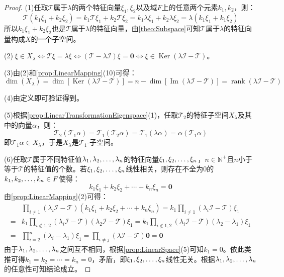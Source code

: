 \begin{proof}
	(1)任取$\mathcal{T}$属于$\lambda$的两个特征向量$\xi_1,\xi_2$以及域$F$上的任意两个元素$k_1,k_2$，则：
	\begin{equation*}
		\mathcal{T}(k_1\xi_1+k_2\xi_2)=k_1\mathcal{T}\xi_1+k_2\mathcal{T}\xi_2=k_1\lambda\xi_1+k_2\lambda\xi_2=\lambda(k_1\xi_1+k_1\xi_2)
	\end{equation*}
	所以$k_1\xi_1+k_2\xi_2$也是$\mathcal{T}$属于$\lambda$的特征向量，由\cref{theo:Subspace}可知$\mathcal{T}$属于$\lambda$的特征向量构成$X$的一个子空间。\par
	(2)$\;\xi\in X_{\lambda}\iff\mathcal{T}\xi=\lambda\xi\iff(\mathcal{T}-\lambda\mathcal{I})\xi=\mathbf{0}\iff\xi\in\operatorname{Ker}(\lambda\mathcal{I}-\mathcal{T})$。\par
	(3)由(2)和\cref{prop:LinearMapping}(10)可得：
	\begin{equation*}
		\dim(X_{\lambda})=\dim[\operatorname{Ker}(\lambda\mathcal{I}-\mathcal{T})]=n-\dim[\operatorname{Im}(\lambda\mathcal{I}-\mathcal{T})]=\operatorname{rank}(\lambda\mathcal{I}-\mathcal{T})
	\end{equation*}\par
	(4)由定义即可验证得到。\par
	(5)根据\cref{prop:LinearTransformationEigenspace}(1)，任取$\mathcal{T}_2$的特征子空间$X_\lambda$及其中的向量$\alpha$，则：
	\begin{equation*}
		\mathcal{T}_2(\mathcal{T}_1\alpha)=\mathcal{T}_1(\mathcal{T}_2\alpha)=\mathcal{T}_1(\lambda\alpha)=\alpha(\mathcal{T}_1\alpha)
	\end{equation*}
	即$\mathcal{T}_1\alpha\in X_\lambda$，于是$X_\lambda$是$\mathcal{T}_1$-子空间。\par
	(6)任取$\mathcal{T}$属于不同特征值$\lambda_1, \lambda_2, \dots, \lambda_{n}$的特征向量$\xi_1, \xi_2, \dots, \xi_{n}$，$n\in\mathbb{N}^+$且$n$小于等于$\mathcal{T}$的特征值的个数。若$\xi_1, \xi_2, \dots, \xi_{n}$线性相关，则存在不全为$0$的$k_1, k_2, \dots, k_{n}\in F$使得：
	\begin{equation*}
		k_1\xi_1+k_2\xi_2+\cdots+k_n\xi_n=\mathbf{0}
	\end{equation*}
	由\cref{prop:LinearMapping}(2)可得：
	\begin{align*}
		&\prod_{i\ne 1}(\lambda_i\mathcal{I}-\mathcal{T})\left(k_1\xi_1+k_2\xi_2+\cdots+k_n\xi_n\right)=k_1\prod_{i\ne 1}(\lambda_i\mathcal{I}-\mathcal{T})\xi_1 \\
		=&k_1\prod_{i\notin{1,2}}(\lambda_i\mathcal{I}-\mathcal{T})(\lambda_2\mathcal{I}-\mathcal{T})\xi_1=k_1\prod_{i\notin{1,2}}(\lambda_i\mathcal{I}-\mathcal{T})(\lambda_2-\lambda_1)\xi_1 \\
		=&\prod_{i=2}^{n}(\lambda_i-\lambda_1)\xi_1=\prod_{i\ne j}(\lambda\mathcal{I}-\mathcal{T})\mathbf{0}=\mathbf{0}
	\end{align*}
	由于$\lambda_1, \lambda_2, \dots, \lambda_{n}$之间互不相同，根据\cref{prop:LinearSpace}(5)可知$k_1=0$。依此类推可得$k_1=k_2=\cdots=k_n=0$，矛盾，即$\xi_1, \xi_2, \dots, \xi_{n}$线性无关。根据$\lambda_1, \lambda_2, \dots, \lambda_{n}$的任意性可知结论成立。
\end{proof}

